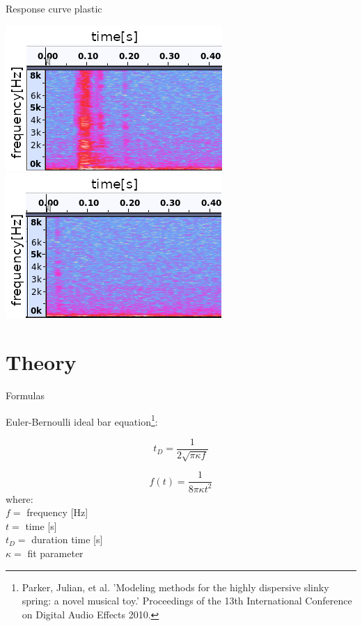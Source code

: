 \documentclass{beamer}
\begin{document}
	\begin{frame}{Response curve plastic}
		\begin{center}
			\includegraphics [scale=0.68]{images/plastic.png}
			\includegraphics [scale=0.68]{images/plastic_echo.png}
		\end{center}
	\end{frame}

\section {Theory}
	\begin{frame}{Formulas}
		
		Euler-Bernoulli ideal bar equation\footnote{ \tiny{ Parker, Julian, et al. 'Modeling methods for the highly dispersive slinky spring: a
novel musical toy.' Proceedings of the 13th International Conference on Digital
Audio Effects 2010.}}:
		
		
		\begin{equation}
			t_D = \frac{1}{2 \sqrt{\pi  \kappa  f}}
		\end{equation}
		
		\begin{equation}
			f(t) = \frac{1} {8 \pi \kappa t^2}
		\end{equation}
		where: \\
		$f =$ frequency [Hz] \\
		$t =$ time [s] \\
		$t_D =$ duration time [s] \\
		$\kappa =$ fit parameter
				
	\end{frame}
\end{document}
